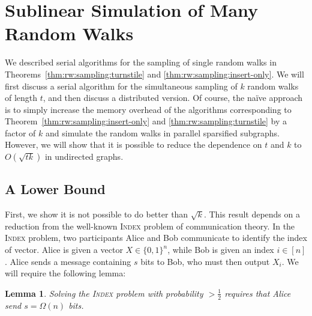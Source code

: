 \documentclass{report}
\newtheorem{lemma}[theorem]{Lemma}
\newcommand{\algoname}[1]{\textnormal{\textsc{#1}}}
\begin{document}


\section{Sublinear Simulation of Many Random Walks}
 \label{walks:sec:walks}

We described serial algorithms for the sampling of single random walks in Theorems~\ref{thm:rw:sampling:turnstile} and \ref{thm:rw:sampling:insert-only}.
We will first discuss a serial algorithm for the simultaneous sampling of $k$ random walks of length $t$, and then discuss a distributed version. 
%
Of course, the na\"ive approach is to simply increase the memory overhead of the algorithms corresponding to Theorem~\ref{thm:rw:sampling:insert-only} and \ref{thm:rw:sampling:turnstile} by a factor of $k$ and simulate the random walks in parallel sparsified subgraphs.
However, we will show that it is possible to reduce the dependence on $t$ and $k$ to $O(\sqrt{tk})$ in undirected graphs.

\subsection{A Lower Bound}
 \label{walks:sec:walks:lb}


First, we show it is not possible to do better than $\sqrt{k}$.
This result depends on a reduction from the well-known \algoname{Index} problem of communication theory.
In the \algoname{Index} problem, two participants Alice and Bob communicate to identify the index of vector.
Alice is given a vector $X \in \{0,1\}^n$, while Bob is given an index $i \in [n]$. 
Alice sends a message containing $s$ bits to Bob, who must then output $X_i$. 
We will require the following lemma:
\begin{lemma} \label{lem:index}
Solving the \algoname{Index} problem with probability $> \frac{1}{2}$ requires that Alice send $s = \Omega(n)$ bits.
\end{lemma}
\end{document}
